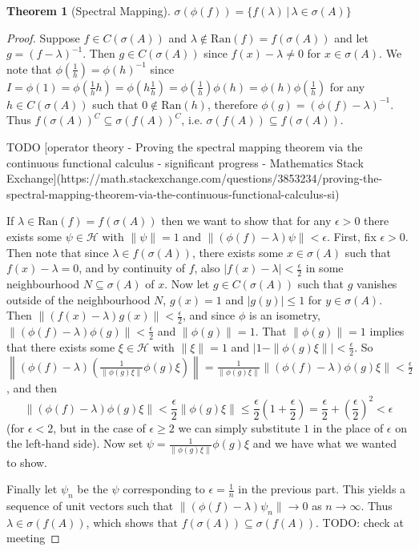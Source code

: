 \documentclass[12pt,oneside]{report}
\newtheorem{thm}{Theorem}[chapter]
\begin{document}
\begin{thm}[Spectral Mapping]
    $\sigma(\phi(f)) = \{ f(\lambda) \, | \, \lambda \in \sigma(A) \}$
\end{thm}
\begin{proof}
    Suppose $f \in C(\sigma(A))$ and $\lambda \notin \text{Ran}(f) = f(\sigma(A))$ and let $g = (f - \lambda)^{-1}$. Then $g \in C(\sigma(A))$ since $f(x) - \lambda \neq 0$ for $x \in \sigma(A)$. We note that $\phi\left( \frac{1}{h} \right) = \phi(h)^{-1}$ since $I = \phi(1) = \phi\left( \frac{1}{h} h \right) = \phi\left( h \frac{1}{h} \right) = \phi\left( \frac{1}{h} \right) \phi(h) = \phi(h) \phi\left( \frac{1}{h} \right)$ for any $h \in C(\sigma(A))$ such that $0 \notin \text{Ran}(h)$, therefore $\phi(g) = (\phi(f) - \lambda)^{-1}$. Thus $f(\sigma(A))^{C} \subseteq \sigma(f(A))^{C}$, i.e. $\sigma(f(A)) \subseteq f(\sigma(A))$.

    TODO [operator theory - Proving the spectral mapping theorem via the continuous functional calculus - significant progress - Mathematics Stack Exchange](https://math.stackexchange.com/questions/3853234/proving-the-spectral-mapping-theorem-via-the-continuous-functional-calculus-si)

    If $\lambda \in \text{Ran}(f) = f(\sigma(A))$ then we want to show that for any $\epsilon > 0$ there exists some $\psi \in \mathscr{H}$ with $\|\psi\| = 1$ and $\|(\phi(f) - \lambda)\psi\| < \epsilon$. First, fix $\epsilon > 0$. Then note that since $\lambda \in f(\sigma(A))$, there exists some $x \in \sigma(A)$ such that $f(x) - \lambda = 0$, and by continuity of $f$, also $|f(x) - \lambda| < \frac{\epsilon}{2}$ in some neighbourhood $N \subseteq \sigma(A)$ of $x$. Now let $g \in C(\sigma(A))$ such that $g$ vanishes outside of the neighbourhood $N$, $g(x) = 1$ and $|g(y)| \leq 1$ for $y \in \sigma(A)$. Then $\|(f(x) - \lambda)g(x)\| < \frac{\epsilon}{2}$, and since $\phi$ is an isometry, $\|(\phi(f) - \lambda)\phi(g)\| < \frac{\epsilon}{2}$ and $\|\phi(g)\| = 1$. That $\|\phi(g)\| = 1$ implies that there exists some $\xi \in \mathscr{H}$ with $\|\xi\| = 1$ and $|1 - \|\phi(g)\xi\|| < \frac{\epsilon}{2}$. So $\left\|(\phi(f) - \lambda)\left(\frac{1}{\|\phi(g)\xi\|}\phi(g)\xi\right)\right\| = \frac{1}{\|\phi(g)\xi\|} \|(\phi(f) - \lambda)\phi(g)\xi\| < \frac{\epsilon}{2}$, and then $$\|(\phi(f) - \lambda)\phi(g)\xi\| < \frac{\epsilon}{2}\|\phi(g)\xi\| \leq \frac{\epsilon}{2}\left( 1 + \frac{\epsilon}{2} \right) = \frac{\epsilon}{2} + \left( \frac{\epsilon}{2} \right)^{2} < \epsilon$$ (for $\epsilon < 2$, but in the case of $\epsilon \geq 2$ we can simply substitute $1$ in the place of $\epsilon$ on the left-hand side). Now set $\psi = \frac{1}{\|\phi(g)\xi\|}\phi(g)\xi$ and we have what we wanted to show.

    Finally let $\psi_{n}$ be the $\psi$ corresponding to $\epsilon = \frac{1}{n}$ in the previous part. This yields a sequence of unit vectors such that $\|(\phi(f) - \lambda)\psi_{n}\| \to 0$ as $n \to \infty$. Thus $\lambda \in \sigma(f(A))$, which shows that $f(\sigma(A)) \subseteq \sigma(f(A))$. TODO: check at meeting
\end{proof}
\end{document}
